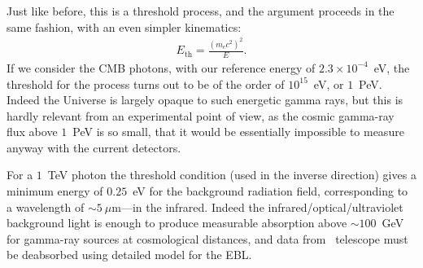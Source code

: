 Just like before, this is a threshold process, and the argument proceeds in the
same fashion, with an even simpler kinematics:
\begin{align}
  E_\text{th} = \frac{(m_e c^2)^2}{E}.
\end{align}
If we consider the CMB photons, with our reference energy of $2.3 \times 10^{-4}$~eV,
the threshold for the process turns out to be of the order of $10^{15}$~eV, or
$1$~PeV. Indeed the Universe is largely opaque to such energetic gamma rays, but
this is hardly relevant from an experimental point of view, as the cosmic gamma-ray
flux above $1$~PeV is so small, that it would be essentially impossible to measure
anyway with the current detectors.

For a $1$~TeV photon the threshold condition (used in the inverse direction) gives
a minimum energy of $0.25$~eV for the background radiation field, corresponding to
a wavelength of $\sim 5~\mu$m---in the infrared. Indeed the infrared/optical/ultraviolet
background light is enough to produce measurable absorption above $\sim 100$~GeV
for gamma-ray sources at cosmological distances, and data from \cherenkov\ telescope
must be deabsorbed using detailed model for the EBL.

